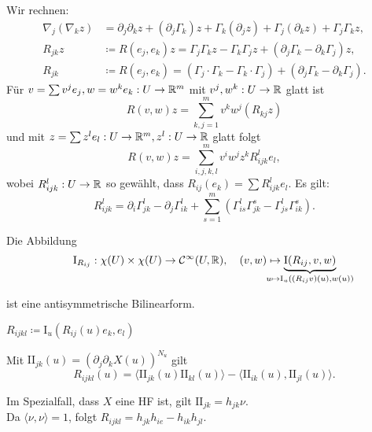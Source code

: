 \documentclass{cheat-sheet}
\newcommand{\I}{\mathrm{I}}
\newcommand{\II}{\mathrm{I\!I}}
\begin{document}

\begin{bem}
  Wir rechnen:
  \begin{align*}
    \nabla_j (\nabla_k z) &= \partial_j \partial_k z + (\partial_j \Gamma_k) z + \Gamma_k (\partial_j z) + \Gamma_j (\partial_k z) + \Gamma_j \Gamma_k z, \\
    R_{jk} z &\coloneqq R(e_j, e_k) z = \Gamma_j \Gamma_k z - \Gamma_k \Gamma_j z + (\partial_j \Gamma_k - \partial_k \Gamma_j) z, \\
    R_{jk} &\coloneqq R(e_j, e_k) = (\Gamma_j \cdot \Gamma_k - \Gamma_k \cdot \Gamma_j) + (\partial_j \Gamma_k - \partial_k \Gamma_j).
  \end{align*}
  Für $v = \sum v^j e_j, w = w^k e_k : U \to \R^m$ mit $v^j, w^k : U \to \mathbb{R}$ glatt ist
  \[ R(v, w) z = \sum_{k,j=1}^m v^k w^j (R_{kj} z) \]
  und mit $z = \sum z^l e_l : U \to \R^m, z^l : U \to \R$ glatt folgt
  \[ R(v, w) z = \sum_{i,j,k,l}^m v^i w^j z^k R_{ijk}^l e_l, \]
  wobei $R_{ijk}^l : U \to \mathbb{R}$ so gewählt, dass $R_{ij}(e_k) = \sum R_{ijk}^l e_l$. Es gilt:
  \[ R_{ijk}^l = \partial_i \Gamma_{jk}^l - \partial_j \Gamma_{ik}^l + \sum_{s=1}^m (\Gamma_{is}^l \Gamma_{jk}^s - \Gamma_{js}^l \Gamma_{ik}^s). \]
\end{bem}

\begin{satz}
  Die Abbildung
  \[
    \I_{R_{ij}} : \chi(U) \times \chi(U) \to \mathcal{C}^\infty(U, \R), \quad
    (v, w) \mapsto \underbrace{\I(R_{ij}, v, w)}_{\mathclap{u \mapsto \I_u((R_{ij} v)(u), w(u))}}
  \]

  \vspace{-12pt}

  ist eine antisymmetrische Bilinearform.
\end{satz}

\begin{nota}
  $R_{ijkl} \coloneqq \I_u(R_{ij}(u) e_k, e_l)$
\end{nota}

\begin{satz}[Gaußgleichung]
  Mit $\II_{jk}(u) = \left( \partial_j \partial_k X(u) \right)^{N_u}$ gilt
  \[ R_{ijkl}(u) = \langle \II_{jk} (u) \II_{kl}(u) \rangle - \langle \II_{ik}(u), \II_{jl}(u) \rangle. \]
\end{satz}

\begin{bem}
  Im Spezialfall, dass $X$ eine HF ist, gilt $\II_{jk} = h_{jk} \nu$.\\
  Da $\langle \nu, \nu \rangle = 1$, folgt $R_{ijkl} = h_{jk} h_{ie} - h_{ik} h_{jl}$.
\end{bem}
\end{document}
